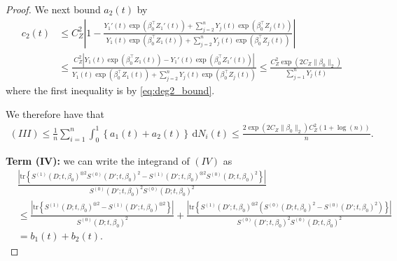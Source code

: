 \documentclass[11pt]{article}
\newcommand{\dint}{\,\mathrm{d}}
\begin{document}
\begin{proof}
We next bound $a_2(t)$ by 
\begin{align*}
    c_2(t) &\leq C_Z^2 \left| 1 - \frac{Y_1'(t) \exp(\beta_0^\top Z_1'(t)) + \sum_{j=2}^n Y_j(t) \exp(\beta_0^\top Z_j(t))}{Y_1(t) \exp(\beta_0^\top Z_1(t)) + \sum_{j=2}^n Y_j(t) \exp(\beta_0^\top Z_j(t))} \right| \\
    &\leq \frac{C_Z^2 |Y_1(t) \exp(\beta_0^\top Z_1(t)) - Y_1'(t) \exp(\beta_0^\top Z_1'(t))|}{Y_1(t) \exp(\beta_0^\top Z_1(t)) + \sum_{j=2}^n Y_j(t) \exp(\beta_0^\top Z_j(t))} \leq \frac{C_Z^2 \exp(2C_Z\|\beta_0\|_2)}{\sum_{j=1}^n Y_j(t)}
\end{align*}
where the first inequality is by \eqref{eq:deg2_bound}.

We therefore have that 
\begin{align*}
    (III) \leq \frac{1}{n} \sum_{i=1}^n \int_0^1 \left\{a_1(t) + a_2(t)\right\} \dint N_i(t) \leq  \frac{2 \exp(2C_Z\|\beta_0\|_2)C_Z^2(1 + \log (n))}{n}.
\end{align*}


\bigskip
\noindent \textbf{Term (IV):} we can write the integrand of $(IV)$ as 
    \begin{align*}
   &\frac{ \left|\mathrm{tr} \left\{S^{(1)}(D; t, \beta_0)^{\otimes 2} S^{(0)}(D'; t, \beta_0)^2 - S^{(1)}(D'; t, \beta_0)^{\otimes 2} S^{(0)}(D; t, \beta_0)^2 \right\} \right|}{S^{(0)}(D';t, \beta_0)^2 S^{(0)}(D; t, \beta_0)^2} \\
   &\leq \frac{ \left|\mathrm{tr} \left\{S^{(1)}(D; t, \beta_0)^{\otimes 2}  - S^{(1)}(D'; t, \beta_0)^{\otimes 2} \right\} \right|}{S^{(0)}(D;t, \beta_0)^2} + \frac{ \left|\mathrm{tr} \left\{S^{(1)}(D'; t, \beta_0)^{\otimes 2} \left(S^{(0)}(D;t, \beta_0)^2 - S^{(0)}(D'; t, \beta_0)^2\right) \right\} \right|}{S^{(0)}(D'; t, \beta_0)^2S^{(0)}(D;t, \beta_0)^2} \\
   &= b_1(t) + b_2(t).
\end{align*}


\end{proof}
\end{document}
